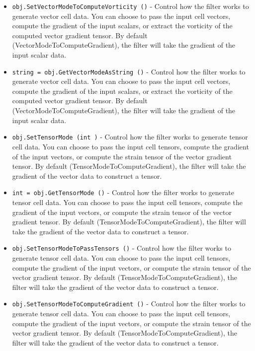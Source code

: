 \begin{itemize}
\item  \verb|obj.SetVectorModeToComputeVorticity ()| -  Control how the filter works to generate vector cell data. You
 can choose to pass the input cell vectors, compute the gradient
 of the input scalars, or extract the vorticity of the computed
 vector gradient tensor. By default (VectorModeToComputeGradient),
 the filter will take the gradient of the input scalar data.

\item  \verb|string = obj.GetVectorModeAsString ()| -  Control how the filter works to generate vector cell data. You
 can choose to pass the input cell vectors, compute the gradient
 of the input scalars, or extract the vorticity of the computed
 vector gradient tensor. By default (VectorModeToComputeGradient),
 the filter will take the gradient of the input scalar data.

\item  \verb|obj.SetTensorMode (int )| -  Control how the filter works to generate tensor cell data. You can
 choose to pass the input cell tensors, compute the gradient of
 the input vectors, or compute the strain tensor of the vector gradient
 tensor. By default (TensorModeToComputeGradient), the filter will
 take the gradient of the vector data to construct a tensor.

\item  \verb|int = obj.GetTensorMode ()| -  Control how the filter works to generate tensor cell data. You can
 choose to pass the input cell tensors, compute the gradient of
 the input vectors, or compute the strain tensor of the vector gradient
 tensor. By default (TensorModeToComputeGradient), the filter will
 take the gradient of the vector data to construct a tensor.

\item  \verb|obj.SetTensorModeToPassTensors ()| -  Control how the filter works to generate tensor cell data. You can
 choose to pass the input cell tensors, compute the gradient of
 the input vectors, or compute the strain tensor of the vector gradient
 tensor. By default (TensorModeToComputeGradient), the filter will
 take the gradient of the vector data to construct a tensor.

\item  \verb|obj.SetTensorModeToComputeGradient ()| -  Control how the filter works to generate tensor cell data. You can
 choose to pass the input cell tensors, compute the gradient of
 the input vectors, or compute the strain tensor of the vector gradient
 tensor. By default (TensorModeToComputeGradient), the filter will
 take the gradient of the vector data to construct a tensor.


\end{itemize}
